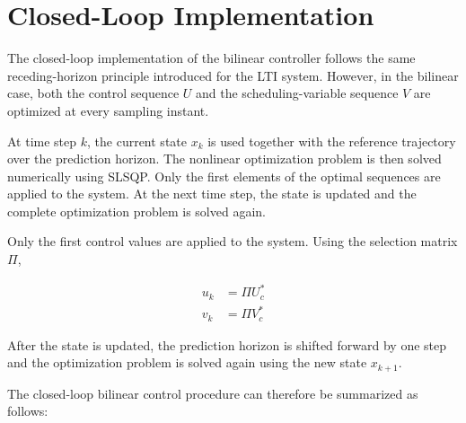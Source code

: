 \section{Closed-Loop Implementation}
\label{sec:bilinear_closed_loop}

The closed-loop implementation of the bilinear controller follows the same receding-horizon principle introduced for the LTI system. However, in the bilinear case, both the control sequence \(U\) and the scheduling-variable sequence \(V\) are optimized at every sampling instant.

At time step \(k\), the current state \(x_k\) is used together with the reference trajectory over the prediction horizon. The nonlinear optimization problem is then solved numerically using SLSQP. Only the first elements of the optimal sequences are applied to the system. At the next time step, the state is updated and the complete optimization problem is solved again.



Only the first control values are applied to the system. Using the selection matrix \(\Pi\),

\begin{align}
    u_k &= \Pi U_c^\ast \\
    v_k &= \Pi V_c^\ast
\end{align}



After the state is updated, the prediction horizon is shifted forward by one step and the optimization problem is solved again using the new state \(x_{k+1}\).

The closed-loop bilinear control procedure can therefore be summarized as follows:

